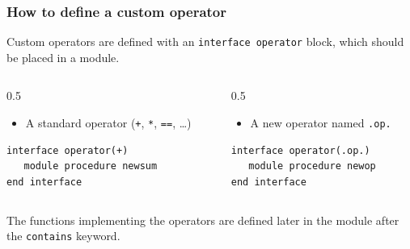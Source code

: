 \begin{frame}[fragile]
  \frametitle{How to define a custom operator}
  Custom operators are defined with an \texttt{interface operator} block, which should be placed in a module.
  \vspace*{2mm}

  \begin{columns}[T]
    \begin{column}{0.5\textwidth}
      \begin{itemize}
            \item A standard operator (\texttt{+}, \texttt{*}, \texttt{==}, \ldots)
      \end{itemize}
\begin{lstlisting}
interface operator(+)
   module procedure newsum
end interface
\end{lstlisting}
    \end{column}

    \begin{column}{0.5\textwidth}
      \begin{itemize}
            \item A new operator named \texttt{.op.}
      \end{itemize}
\begin{lstlisting}
interface operator(.op.)
   module procedure newop
end interface
\end{lstlisting}
    \end{column}
  \end{columns}

  \vspace*{2mm}
  The functions implementing the operators are defined later in the module after the \texttt{contains} keyword.
\end{frame}


